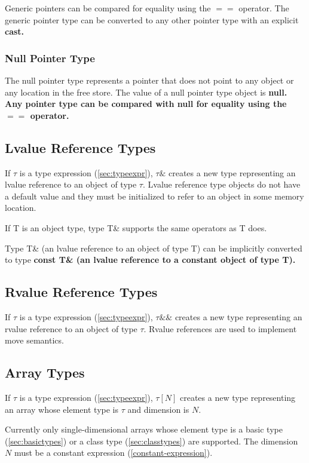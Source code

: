 \documentclass[a4paper,oneside,11pt]{article}
\begin{document}
Generic pointers can be compared for equality using the $==$ operator.
The generic pointer type can be converted to any other pointer type with an explicit \bf{cast}.

\subsubsection{Null Pointer Type}

The null pointer type represents a pointer that does not point to any object or any location in the free store.
The value of a null pointer type object is \bf{null}.
Any pointer type can be compared with \bf{null} for equality using the $==$ operator.

\subsection{Lvalue Reference Types}\label{sec:lvaluereferencetypes}

If $\tau$ is a type expression (\ref{sec:typeexpr}), $\tau\&$ creates a new type representing an lvalue reference to an object of type $\tau$.
Lvalue reference type objects do not have a default value and they must be initialized to refer to an object in some memory location.

If T is an object type, type T\& supports the same operators as T does.

Type T\& (an lvalue reference to an object of type T) can be implicitly converted to type \bf{const} T\&
(an lvalue reference to a constant object of type T).

\subsection{Rvalue Reference Types}\label{sec:rvaluereferencetypes}

If $\tau$ is a type expression (\ref{sec:typeexpr}), $\tau\&\&$ creates a new type representing an rvalue reference to an object of type $\tau$.
Rvalue references are used to implement move semantics.

\subsection{Array Types}\label{sec:arraytypes}

If $\tau$ is a type expression (\ref{sec:typeexpr}), $\tau[N]$ creates a new type representing an array whose element type is $\tau$ and dimension is $N$.

Currently only single-dimensional arrays whose element type is a basic type (\ref{sec:basictypes}) or
a class type (\ref{sec:classtypes}) are supported.
The dimension $N$ must be a constant expression (\ref{constant-expression}).
\end{document}
